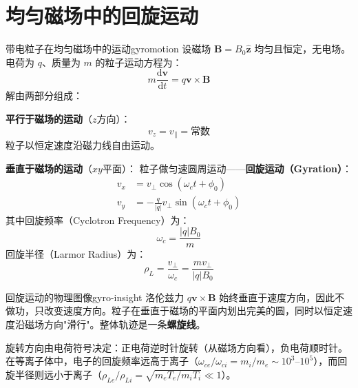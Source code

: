\documentclass[12pt,a4paper,openany,oneside]{book}
\newcommand{\diff}{\mathrm{d}}
\newcommand{\vect}[1]{\bm{#1}}
\newcommand{\unitvec}[1]{\hat{\vect{#1}}}
\newcommand{\difficulty}[1]{\marginnote{\hfill\textcolor{coverMid!80}{\rule[-0.1em]{2pt}{0.9em}}\,\textcolor{coverMid}{\footnotesize\textbf{[#1]}}}}
\begin{document}
\section{均匀磁场中的回旋运动}\difficulty{基础}

\begin{theorem}{带电粒子在均匀磁场中的运动}{gyromotion}
设磁场 $\vect{B} = B_0\unitvec{z}$ 均匀且恒定，无电场。电荷为 $q$、质量为 $m$ 的粒子运动方程为：
\[
m\frac{\diff\vect{v}}{\diff t} = q\vect{v}\times\vect{B}
\]
解由两部分组成：

\textbf{平行于磁场的运动}（$z$方向）：
\[
v_z = v_{\parallel} = \text{常数}
\]
粒子以恒定速度沿磁力线自由运动。

\textbf{垂直于磁场的运动}（$xy$平面）：
粒子做匀速圆周运动——\textbf{回旋运动（Gyration）}：
\begin{align*}
v_x &= v_\perp \cos(\omega_c t + \phi_0) \\
v_y &= -\frac{q}{|q|} v_\perp \sin(\omega_c t + \phi_0)
\end{align*}
其中回旋频率（Cyclotron Frequency）为：
\[
\omega_c = \frac{|q|B_0}{m}
\]
回旋半径（Larmor Radius）为：
\[
\rho_L = \frac{v_\perp}{\omega_c} = \frac{m v_\perp}{|q|B_0}
\]
\end{theorem}

\begin{insight}{回旋运动的物理图像}{gyro-insight}
洛伦兹力 $q\vect{v}\times\vect{B}$ 始终垂直于速度方向，因此不做功，只改变速度方向。粒子在垂直于磁场的平面内划出完美的圆，同时以恒定速度沿磁场方向"滑行"。整体轨迹是一条\textbf{螺旋线}。

旋转方向由电荷符号决定：正电荷逆时针旋转（从磁场方向看），负电荷顺时针。在等离子体中，电子的回旋频率远高于离子（$\omega_{ce}/\omega_{ci} = m_i/m_e \sim 10^3$--$10^5$），而回旋半径则远小于离子（$\rho_{Le}/\rho_{Li} = \sqrt{m_e T_e/m_i T_i} \ll 1$）。
\end{insight}

\begin{center}
\end{center}
\end{document}
